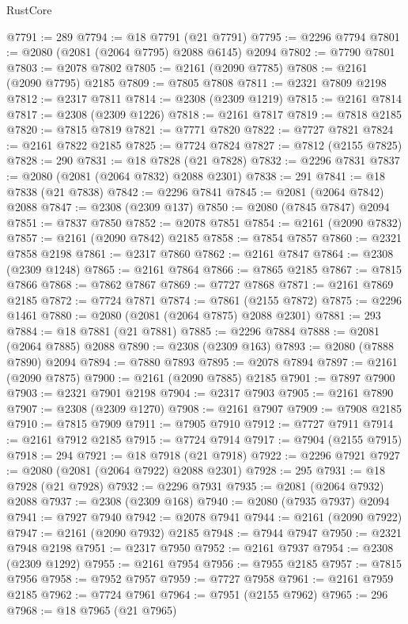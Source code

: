 \begin{lexlean}{RustCore}
\begin{coremodule}
@7791 := 289
@7794 := @18 @7791 (@21 @7791)
@7795 := @2296 @7794
@7801 := @2080 (@2081 (@2064 @7795) @2088 @6145) @2094
@7802 := @7790 @7801
@7803 := @2078 @7802
@7805 := @2161 (@2090 @7785)
@7808 := @2161 (@2090 @7795) @2185
@7809 := @7805 @7808
@7811 := @2321 @7809 @2198
@7812 := @2317 @7811
@7814 := @2308 (@2309 @1219)
@7815 := @2161 @7814
@7817 := @2308 (@2309 @1226)
@7818 := @2161 @7817
@7819 := @7818 @2185
@7820 := @7815 @7819
@7821 := @7771 @7820
@7822 := @7727 @7821
@7824 := @2161 @7822 @2185
@7825 := @7724 @7824
@7827 := @7812 (@2155 @7825)
@7828 := 290
@7831 := @18 @7828 (@21 @7828)
@7832 := @2296 @7831
@7837 := @2080 (@2081 (@2064 @7832) @2088 @2301)
@7838 := 291
@7841 := @18 @7838 (@21 @7838)
@7842 := @2296 @7841
@7845 := @2081 (@2064 @7842) @2088
@7847 := @2308 (@2309 @137)
@7850 := @2080 (@7845 @7847) @2094
@7851 := @7837 @7850
@7852 := @2078 @7851
@7854 := @2161 (@2090 @7832)
@7857 := @2161 (@2090 @7842) @2185
@7858 := @7854 @7857
@7860 := @2321 @7858 @2198
@7861 := @2317 @7860
@7862 := @2161 @7847
@7864 := @2308 (@2309 @1248)
@7865 := @2161 @7864
@7866 := @7865 @2185
@7867 := @7815 @7866
@7868 := @7862 @7867
@7869 := @7727 @7868
@7871 := @2161 @7869 @2185
@7872 := @7724 @7871
@7874 := @7861 (@2155 @7872)
@7875 := @2296 @1461
@7880 := @2080 (@2081 (@2064 @7875) @2088 @2301)
@7881 := 293
@7884 := @18 @7881 (@21 @7881)
@7885 := @2296 @7884
@7888 := @2081 (@2064 @7885) @2088
@7890 := @2308 (@2309 @163)
@7893 := @2080 (@7888 @7890) @2094
@7894 := @7880 @7893
@7895 := @2078 @7894
@7897 := @2161 (@2090 @7875)
@7900 := @2161 (@2090 @7885) @2185
@7901 := @7897 @7900
@7903 := @2321 @7901 @2198
@7904 := @2317 @7903
@7905 := @2161 @7890
@7907 := @2308 (@2309 @1270)
@7908 := @2161 @7907
@7909 := @7908 @2185
@7910 := @7815 @7909
@7911 := @7905 @7910
@7912 := @7727 @7911
@7914 := @2161 @7912 @2185
@7915 := @7724 @7914
@7917 := @7904 (@2155 @7915)
@7918 := 294
@7921 := @18 @7918 (@21 @7918)
@7922 := @2296 @7921
@7927 := @2080 (@2081 (@2064 @7922) @2088 @2301)
@7928 := 295
@7931 := @18 @7928 (@21 @7928)
@7932 := @2296 @7931
@7935 := @2081 (@2064 @7932) @2088
@7937 := @2308 (@2309 @168)
@7940 := @2080 (@7935 @7937) @2094
@7941 := @7927 @7940
@7942 := @2078 @7941
@7944 := @2161 (@2090 @7922)
@7947 := @2161 (@2090 @7932) @2185
@7948 := @7944 @7947
@7950 := @2321 @7948 @2198
@7951 := @2317 @7950
@7952 := @2161 @7937
@7954 := @2308 (@2309 @1292)
@7955 := @2161 @7954
@7956 := @7955 @2185
@7957 := @7815 @7956
@7958 := @7952 @7957
@7959 := @7727 @7958
@7961 := @2161 @7959 @2185
@7962 := @7724 @7961
@7964 := @7951 (@2155 @7962)
@7965 := 296
@7968 := @18 @7965 (@21 @7965)

\end{coremodule}
\end{lexlean}

